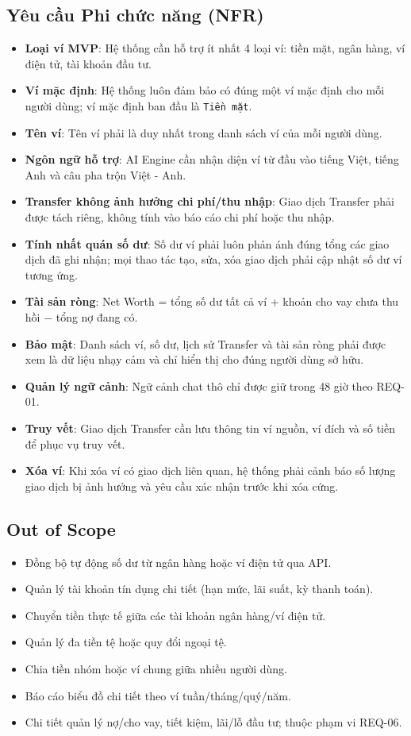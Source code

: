 \subsection{Yêu cầu Phi chức năng (NFR)}

\begin{itemize}
\item \textbf{Loại ví MVP}: Hệ thống cần hỗ trợ ít nhất 4 loại ví: tiền mặt, ngân hàng, ví điện tử, tài khoản đầu tư.
\item \textbf{Ví mặc định}: Hệ thống luôn đảm bảo có đúng một ví mặc định cho mỗi người dùng; ví mặc định ban đầu là \texttt{Tiền mặt}.
\item \textbf{Tên ví}: Tên ví phải là duy nhất trong danh sách ví của mỗi người dùng.
\item \textbf{Ngôn ngữ hỗ trợ}: AI Engine cần nhận diện ví từ đầu vào tiếng Việt, tiếng Anh và câu pha trộn Việt - Anh.
\item \textbf{Transfer không ảnh hưởng chi phí/thu nhập}: Giao dịch Transfer phải được tách riêng, không tính vào báo cáo chi phí hoặc thu nhập.
\item \textbf{Tính nhất quán số dư}: Số dư ví phải luôn phản ánh đúng tổng các giao dịch đã ghi nhận; mọi thao tác tạo, sửa, xóa giao dịch phải cập nhật số dư ví tương ứng.
\item \textbf{Tài sản ròng}: Net Worth = tổng số dư tất cả ví + khoản cho vay chưa thu hồi − tổng nợ đang có.
\item \textbf{Bảo mật}: Danh sách ví, số dư, lịch sử Transfer và tài sản ròng phải được xem là dữ liệu nhạy cảm và chỉ hiển thị cho đúng người dùng sở hữu.
\item \textbf{Quản lý ngữ cảnh}: Ngữ cảnh chat thô chỉ được giữ trong 48 giờ theo REQ-01.
\item \textbf{Truy vết}: Giao dịch Transfer cần lưu thông tin ví nguồn, ví đích và số tiền để phục vụ truy vết.
\item \textbf{Xóa ví}: Khi xóa ví có giao dịch liên quan, hệ thống phải cảnh báo số lượng giao dịch bị ảnh hưởng và yêu cầu xác nhận trước khi xóa cứng.
\end{itemize}
\subsection{Out of Scope}

\begin{itemize}
\item Đồng bộ tự động số dư từ ngân hàng hoặc ví điện tử qua API.
\item Quản lý tài khoản tín dụng chi tiết (hạn mức, lãi suất, kỳ thanh toán).
\item Chuyển tiền thực tế giữa các tài khoản ngân hàng/ví điện tử.
\item Quản lý đa tiền tệ hoặc quy đổi ngoại tệ.
\item Chia tiền nhóm hoặc ví chung giữa nhiều người dùng.
\item Báo cáo biểu đồ chi tiết theo ví tuần/tháng/quý/năm.
\item Chi tiết quản lý nợ/cho vay, tiết kiệm, lãi/lỗ đầu tư; thuộc phạm vi REQ-06.
\end{itemize}
